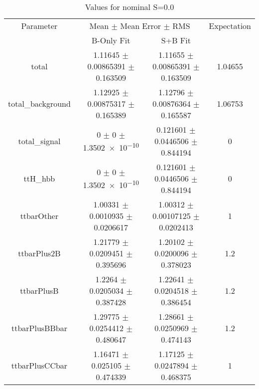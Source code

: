 \begin{table}
\centering
\caption{Values for nominal S=0.0}
\begin{tabular}{cccc}
\toprule
Parameter & \multicolumn{2}{c}{Mean $\pm$ Mean Error $\pm$ RMS} & Expectation\\
 & B-Only Fit & S+B Fit & \\
\midrule
total & \num{1.11645} $\pm$ \num{0.00865391} $\pm$ \num{0.163509} & \num{1.11655} $\pm$ \num{0.00865391} $\pm$ \num{0.163509} & \num{1.04655}\\
total\_background & \num{1.12925} $\pm$ \num{0.00875317} $\pm$ \num{0.165389} & \num{1.12796} $\pm$ \num{0.00876364} $\pm$ \num{0.165587} & \num{1.06753}\\
total\_signal & \num{0} $\pm$ \num{0} $\pm$ \num{1.3502e-10} & \num{0.121601} $\pm$ \num{0.0446506} $\pm$ \num{0.844194} & \num{0}\\
ttH\_hbb & \num{0} $\pm$ \num{0} $\pm$ \num{1.3502e-10} & \num{0.121601} $\pm$ \num{0.0446506} $\pm$ \num{0.844194} & \num{0}\\
ttbarOther & \num{1.00331} $\pm$ \num{0.0010935} $\pm$ \num{0.0206617} & \num{1.00312} $\pm$ \num{0.00107125} $\pm$ \num{0.0202413} & \num{1}\\
ttbarPlus2B & \num{1.21779} $\pm$ \num{0.0209451} $\pm$ \num{0.395696} & \num{1.20102} $\pm$ \num{0.0200096} $\pm$ \num{0.378023} & \num{1.2}\\
ttbarPlusB & \num{1.2264} $\pm$ \num{0.0205034} $\pm$ \num{0.387428} & \num{1.22641} $\pm$ \num{0.0204518} $\pm$ \num{0.386454} & \num{1.2}\\
ttbarPlusBBbar & \num{1.29775} $\pm$ \num{0.0254412} $\pm$ \num{0.480647} & \num{1.28661} $\pm$ \num{0.0250969} $\pm$ \num{0.474143} & \num{1.2}\\
ttbarPlusCCbar & \num{1.16471} $\pm$ \num{0.025105} $\pm$ \num{0.474339} & \num{1.17125} $\pm$ \num{0.0247894} $\pm$ \num{0.468375} & \num{1}\\
\bottomrule
\end{tabular}
\end{table}